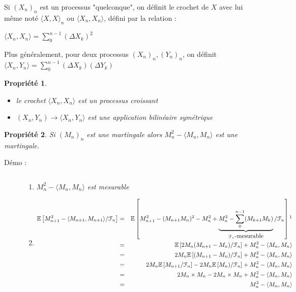\documentclass{report}
\newtheorem{prop}{Propri\'et\'e}
\newenvironment{encadre}{%
  \setlength{\theorempreskipamount}{0pt}%
  \setlength{\theorempostskipamount}{0pt}%
  \begin{framed}%
 }{%
  \vspace{-2pt}%
  \end{framed}%
 }
\begin{document}
Si $\left(X_n\right)_n$ est un processus "quelconque", on définit le crochet de $X$ avec lui même noté $\langle X,X\rangle_n$ ou $\langle X_n, X_n \rangle$, défini par la relation : 
\begin{center}
    $\langle X_n, X_n\rangle = \displaystyle\sum_0^{n-1}(\Delta X_k)^2$
\end{center}
Plus généralement, pour deux processus $\left(X_n\right)_n, \left(Y_n\right)_n$, on définit $\langle X_n, Y_n\rangle = \displaystyle\sum_0^{n-1}(\Delta X_k)(\Delta Y_k)$

\begin{encadre}
\begin{prop}$\ $
\begin{itemize}
    \item le crochet $\langle X_n, X_n \rangle$ est un processus croissant
    \item $(X_n, Y_n) \to \langle X_n, Y_n \rangle$ est une application bilinéaire symétrique
\end{itemize}
\end{prop}
\end{encadre}

\begin{encadre}
\begin{prop} Si $\left(M_n\right)_n$ est une martingale alors $M_n^2-\langle M_n, M_n \rangle$ est une martingale.
\begin{description}
    \item [Démo : ] $\ $
    \begin{enumerate}
        \item $M_n^2-\langle M_n, M_n \rangle$ est mesurable 
        \item \begin{eqnarray}
        \mathbb{E}\left[M_{n+1}^2-\langle M_{n+1}, M_{n+1} \rangle/\EuScript{F}_n\right] & = & \mathbb{E}\left[M_{n+1}^2-(M_{n+1}M_n)^2-M_n^2+\underbrace{M_n^2-\displaystyle\sum_0^{n-1}(M_{k+1} M_k)}_{\EuScript{F}_n\mbox{-mesurable}}/\EuScript{F}_n\right]\footnotemark\nonumber \\
        &=& \mathbb{E}\left[2M_{n}(M_{n+1}-M_n)/\EuScript{F}_n\right]+M_n^2-\langle M_n, M_n \rangle \nonumber \\
        &=& 2M_{n}\mathbb{E}\left[(M_{n+1}-M_n)/\EuScript{F}_n\right]+M_n^2-\langle M_n, M_n \rangle \nonumber \\
        &=& 2M_{n}\mathbb{E}\left[M_{n+1}/\EuScript{F}_n\right]-2M_{n}\mathbb{E}\left[M_n)/\EuScript{F}_n\right]+M_n^2-\langle M_n, M_n \rangle \nonumber \\
        &=& 2M_n\times M_n -2M_n \times M_n + M_n^2 - \langle M_n, M_n \rangle\nonumber\\
        &=& M_n^2 - \langle M_n, M_n \rangle\nonumber
        \end{eqnarray}
    \end{enumerate}
\end{description}

\end{prop}
\end{encadre}
\end{document}
